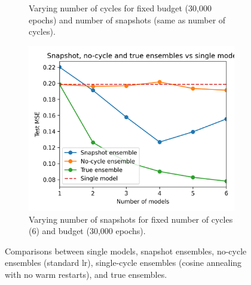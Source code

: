 \begin{figure}[]
\begin{subfigure}{.45\textwidth}
		\caption{Varying number of cycles for fixed budget (30,000 epochs) and number of snapshots (same as number of cycles).}
		\label{fig:sub-second}
	\end{subfigure}
	\begin{subfigure}{.45\textwidth}
		\centering
		\includegraphics[width=1\linewidth]{./figs/vary_snaps.png}  
		\caption{Varying number of snapshots for fixed number of cycles (6) and budget (30,000 epochs).}
		\label{fig:sub-second}
	\end{subfigure}
	\caption{Comparisons between single models, snapshot ensembles, no-cycle ensembles (standard lr), single-cycle ensembles (cosine annealing with no warm restarts), and true ensembles.}
	\label{fig:fig}
\end{figure}

\blindtext

